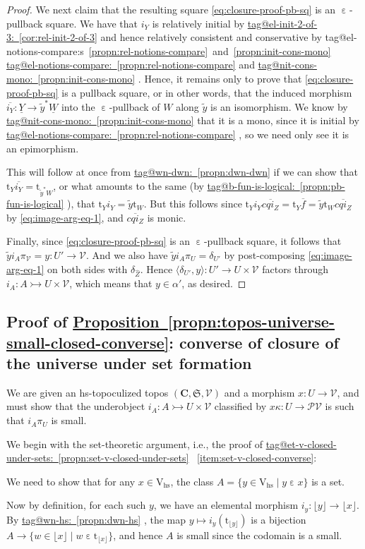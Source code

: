 \documentclass{amsart}
\makeatletter
\newcommand\alttext{\texorpdfstring}
\newcommand\bC{\mathbf{C}}
\newcommand\br[1]{\langle{}#1\rangle{}}
\newcommand\cV{\mathcal{V}}
\newcommand\ein{\mathrel{\varepsilon}}
\newcommand\floor[2][]{#1\lfloor #2 #1\rfloor}
\newcommand\fS{\mathfrak{S}}
\newcommand\hs{\mathrm{hs}}
\newcommand\ol[1]{\overline{#1}}
\newcommand\pow{\mathcal{P}}
\newcommand\rt{\mathrm{t}}
\newcommand\rV{\mathrm{V}}
\newcommand\set[2][]{#1\{ #2 #1\}}
\newcommand\tto{\rightarrowtail}
\newcommand\und[1]{\underline{#1}}
\newcommand\unein{{\ein}}
\newcommand\wh[1]{\widehat{#1}}
\newcommand\tagword[1]{\csname tag@#1\endcsname}
\def\label@tag#1:#2\@nil{#1}
\newcommand\labeltag[1]{\label@tag#1:\@nil}
\newcommand\jref[1]{%
  \texorpdfstring%
    {\hyperref[#1]{\tagword{\labeltag{#1}}~\ref*{#1}}}%
    {\tagword{\labeltag{#1}}~\ref*{#1}}%
}
\newcommand\jrefs[2]{%
  \ifthenelse{\equal{\labeltag{#1}}{\labeltag{#2}}}%
  {%
    \texorpdfstring%
      {\tagword{\labeltag{#1}}s~\ref{#1}~and~\ref{#2}}%
      {\tagword{\labeltag{#1}}s~\ref*{#1}~and~\ref*{#2}}%
  }{\jref{#1} and \jref{#2}}%
}
\theoremstyle{definition}
\theoremstyle{remark}
\theoremstyle{plainwithref}
\newenvironment{settybox}{\begin{tcolorbox}[colback=blue!20,breakable%
    ,enhanced%
    ,sharp corners%
    ,frame hidden%
    ,boxsep=0pt
    ,left=5pt,right=5pt,top=5pt,bottom=5pt
    ,enlarge left by=-5pt,width=\linewidth+10pt
    ,enlarge top by=5pt,enlarge bottom by=5pt
    ,before skip balanced=0pt,after skip balanced=0pt
    ]}{\end{tcolorbox}}
\makeatother
\begin{document}
\begin{proof}
  We next claim that the resulting square \eqref{eq:closure-proof-pb-sq} is an \( \unein \)-pullback square.
  We have that \( i_Y \) is relatively initial by \jref{cor:rel-init-2-of-3} and hence relatively consistent and conservative by \jrefs{propn:rel-notions-compare}{propn:init-cons-mono}.
  Hence, it remains only to prove that \eqref{eq:closure-proof-pb-sq} is a pullback square, or in other words, that the induced morphism \( \ol{i_Y} \colon \und Y \to \tilde y^* \und W \) into the \( \unein \)-pullback of \( W \) along \( \tilde y \) is an isomorphism.
  We know by \jref{propn:init-cons-mono} that it is a mono, since it is initial by \jref{propn:rel-notions-compare}, so we need only see it is an epimorphism.

  This will follow at once from \jref{propn:dwn-dwn} if we can show that \( \rt_Y \ol{i_Y} = \rt_{\tilde y^* W} \), or what amounts to the same (by \jref{propn:pb-fun-is-logical}), that \( \rt_Y i_Y = \tilde y \rt_W \).
  But this follows since \( \rt_Y i_Y \ol{c q i_Z} = \rt_Y \ol f = \tilde y \rt_W \ol{c q i_Z} \) by \eqref{eq:image-arg-eq-1}, and \( \ol{c q i_Z} \) is monic.

  Finally, since \eqref{eq:closure-proof-pb-sq} is an \( \unein \)-pullback square, it follows that \( \tilde y i_A \pi_{\cV} = y \colon U' \to \cV \).
  And we also have \( \tilde y i_A \pi_U = \delta_{U'} \) by post-composing \eqref{eq:image-arg-eq-1} on both sides with \( \delta_{\wh Z} \).
  Hence \( \br{\delta_{U'}, y} \colon U' \to U \times \cV \) factors through \( i_A \colon A \tto U \times \cV \), which means that \( y \in \alpha' \), as desired.
\end{proof}

\subsection{Proof of \alttext{\hyperref[propn:topos-universe-small-closed-converse]{Proposition~\ref*{propn:topos-universe-small-closed-converse}}}{Proposition~\ref*{propn:topos-universe-small-closed-converse}}: converse of closure of the universe under set formation} \label{subsec:proof-of-small-converse}
We are given an hs-topoculized topos \( (\bC, \fS, \cV) \) and a morphism \( x \colon U \to \cV \), and must show that the underobject \( i_A \colon A \tto U \times \cV \) classified by \( x \kappa \colon U \to \pow \cV  \) is such that \( i_A \pi_U \) is small.

We begin with the set-theoretic argument, i.e., the proof of \jref{propn:set-v-closed-under-sets}~\ref{item:set-v-closed-converse}:
\begin{settybox}
  We need to show that for any \( x \in \rV_{\hs} \), the class \( A = \set{y \in \rV_{\hs} \mid y \ein x} \) is a set.

  Now by definition, for each such \( y \), we have an elemental morphism \( i_y \colon \floor{y} \to \floor{x} \).
  By \jref{propn:dwn-hs}, the map \( y \mapsto i_y(\rt_{\floor{y}}) \) is a bijection \( A \to \set{w \in \floor{x} \mid w \ein \rt_{\floor{x}}} \), and hence \( A \) is small since the codomain is a small.
\end{settybox}
\end{document}
